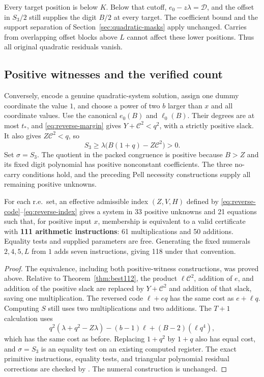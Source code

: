 Every target position is below $K$. Below that cutoff,
$e_0-z\lambda=\mathcal D$, and the offset in $S_3/2$ still supplies
the digit $B/2$ at every target. The coefficient bound and the support
separation of Section~\ref{sec:quadratic-masks} apply unchanged.
Carries from overlapping offset blocks above $L$ cannot affect these
lower positions. Thus all original quadratic residuals vanish.

\subsection{Positive witnesses and the verified count}

Conversely, encode a genuine quadratic-system solution, assign one dummy
coordinate the value $1$, and choose a power of two $b$ larger than $x$
and all coordinate values. Use the canonical $e_0(B)$ and $\ell_0(B)$.
Their degrees are at most $t_*$, and \eqref{eq:reverse-margin} gives
$Y+\mathcal C^2<q^2$, with a strictly positive slack.
It also gives $Z\mathcal C^2<q$, so
\[
 S_3\ge\lambda\bigl(B(1+q)-Z\mathcal C^2\bigr)>0.
\]
Set $\sigma=S_3$. The quotient in the packed congruence is positive
because $B>Z$ and its fixed digit polynomial has positive nonconstant
coefficients. The three no-carry conditions hold, and the preceding
Pell necessity constructions supply all remaining positive unknowns.

\begin{theorem}\label{thm:best111}
For each r.e.\ set, an effective admissible index $(Z,V,H)$ defined by
\eqref{eq:reverse-code}--\eqref{eq:reverse-index} gives a system in
33 positive unknowns and 21 equations such that, for positive input $x$,
membership is equivalent to a valid certificate with
\textbf{111 arithmetic instructions}: 61 multiplications and 50 additions.
Equality tests and supplied parameters are free. Generating the fixed
numerals $2,4,5,L$ from $1$ adds seven instructions, giving 118 under
that convention.
\end{theorem}
\begin{proof}
The equivalence, including both positive-witness constructions, was
proved above. Relative to Theorem~\ref{thm:best112}, the product
$\ell\mathcal C^2$, addition of $e$, and addition of the positive slack
are replaced by $Y+\mathcal C^2$ and addition of that slack, saving one
multiplication. The reversed code $\ell+eq$ has the same cost as
$e+\ell q$. Computing $S$ still uses two multiplications and two
additions. The $T+1$ calculation uses
\[
 q^2(\lambda+q^2-Z\lambda)
       -(b-1)\ell+(B-2)(\ell q^4),
\]
which has the same cost as before. Replacing $1+q^2$ by $1+q$ also has
equal cost, and $\sigma=S_3$ is an equality test on an existing computed
register. The exact primitive instructions, equality tests, and
triangular polynomial residual corrections are checked by
. The numeral construction is unchanged.
\end{proof}
